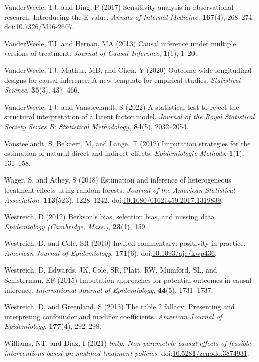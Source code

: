 \documentclass[
  singlecolumn]{article}
\newlength{\cslhangindent}
\newenvironment{CSLReferences}[2] %
 {\begin{list}{}{%
  \setlength{\itemindent}{0pt}
  \setlength{\leftmargin}{0pt}
  \setlength{\parsep}{0pt}
  \ifodd #1
   \setlength{\leftmargin}{\cslhangindent}
   \setlength{\itemindent}{-1\cslhangindent}
  \fi
  \setlength{\itemsep}{#2\baselineskip}}}
 {\end{list}}
\begin{document}
\begin{CSLReferences}{1}{0}
VanderWeele, TJ, and Ding, P (2017) Sensitivity analysis in
observational research: Introducing the {E}-value. \emph{Annals of
Internal Medicine}, \textbf{167}(4), 268--274.
doi:\href{https://doi.org/10.7326/M16-2607}{10.7326/M16-2607}.

VanderWeele, TJ, and Hernan, MA (2013) Causal inference under multiple
versions of treatment. \emph{Journal of Causal Inference},
\textbf{1}(1), 1--20.

VanderWeele, TJ, Mathur, MB, and Chen, Y (2020) Outcome-wide
longitudinal designs for causal inference: A new template for empirical
studies. \emph{Statistical Science}, \textbf{35}(3), 437--466.

VanderWeele, TJ, and Vansteelandt, S (2022) A statistical test to reject
the structural interpretation of a latent factor model. \emph{Journal of
the Royal Statistical Society Series B: Statistical Methodology},
\textbf{84}(5), 2032--2054.

Vansteelandt, S, Bekaert, M, and Lange, T (2012) Imputation strategies
for the estimation of natural direct and indirect effects.
\emph{Epidemiologic Methods}, \textbf{1}(1), 131--158.

Wager, S, and Athey, S (2018) Estimation and inference of heterogeneous
treatment effects using random forests. \emph{Journal of the American
Statistical Association}, \textbf{113}(523), 1228--1242.
doi:\href{https://doi.org/10.1080/01621459.2017.1319839}{10.1080/01621459.2017.1319839}.

Westreich, D (2012) Berkson's bias, selection bias, and missing data.
\emph{Epidemiology (Cambridge, Mass.)}, \textbf{23}(1), 159.

Westreich, D, and Cole, SR (2010) Invited commentary: positivity in
practice. \emph{American Journal of Epidemiology}, \textbf{171}(6).
doi:\href{https://doi.org/10.1093/aje/kwp436}{10.1093/aje/kwp436}.

Westreich, D, Edwards, JK, Cole, SR, Platt, RW, Mumford, SL, and
Schisterman, EF (2015) Imputation approaches for potential outcomes in
causal inference. \emph{International Journal of Epidemiology},
\textbf{44}(5), 1731--1737.

Westreich, D, and Greenland, S (2013) The table 2 fallacy: Presenting
and interpreting confounder and modifier coefficients. \emph{American
Journal of Epidemiology}, \textbf{177}(4), 292--298.

Williams, NT, and Díaz, I (2021) \emph{{l}mtp: Non-parametric causal
effects of feasible interventions based on modified treatment policies}.
doi:\href{https://doi.org/10.5281/zenodo.3874931}{10.5281/zenodo.3874931}.

\end{CSLReferences}
\end{document}
